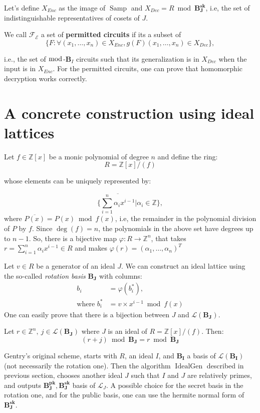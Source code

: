 Let's define $X_{Enc}$ as the image of $\operatorname{Samp}$ and $X_{Dec}=R\bmod\mathbf{B_J^{sk}}$, i.e, the set of indistinguishable representatives of cosets of $J$.

We call $\mathcal{F_E}$ a set of \textbf{permitted circuits} if its a subset of
$$\{F:\forall (x_1,\ldots,x_n)\in X_{Enc}, g(F)(x_1,\ldots,x_n)\in X_{Dec}\},$$

i.e., the set of $\bmod$-$\mathbf B_I$ circuits such that its generalization is in $X_{Dec}$ when the input is in $X_{Enc}$. For the permitted circuits, one can prove that homomorphic decryption works correctly.

\section{A concrete construction using ideal lattices}

Let $f\in\mathbb{Z}[x]$ be a monic polynomial of degree $n$ and define the ring:
$$R=\mathbb{Z}[x]/(f)$$

whose elements can be uniquely represented by:

$$\Big\{\overline{\displaystyle\sum_{i=1}^{n}\alpha_ix^{i-1}}|\alpha_i\in\mathbb Z\Big\},$$
where $\overline{P(x)}=P(x)\bmod f(x)$, i.e, the remainder in the polynomial division of $P$ by $f$. Since $\deg(f)=n$, the polynomials in the above set have degrees up to $n-1$. So, there is a bijective map $\varphi:R\to\mathbb{Z}^n$, that takes $r=\sum_{i=1}^{n}\alpha_ix^{i-1}\in R$ and makes $\varphi(r)=(\alpha_1,\ldots,\alpha_n)^T$

Let $v\in R$ be a generator of an ideal $J$. We can construct an ideal lattice using the so-called \textit{rotation basis} $\mathbf{B_J}$ with columns: 
\begin{align*}
    b_i&=\varphi(b_i^*),\\ 
    \text{where } b_i^*&=v\times x^{i-1}\bmod f(x)
\end{align*}
One can easily prove that there is a bijection between $J$ and $\mathcal{L}(\mathbf{B_J})$.
\begin{lemma}
\label{reduction}
Let $r\in\mathbb{Z}^n,~j\in\mathcal{L}(\mathbf{B_J})$ where $J$ is an ideal of $R=\mathbb{Z}[x]/(f)$. Then:
$$(r+j)\bmod \mathbf{B_J}=r\bmod \mathbf{B_J}$$
\end{lemma}

Gentry's original scheme, starts with $R$, an ideal $I$, and $\mathbf{B_I}$ a basis of $\mathcal{L}(\mathbf{B_I})$ (not necessarily the rotation one). Then the algorithm $\operatorname{IdealGen}$ described in previous section, chooses another ideal $J$ such that $I$ and $J$ are relatively primes, and outputs $\mathbf{B_J^{pk}},\mathbf{B_J^{sk}}$ basis of $\mathcal{L}_J$. A possible choice for the secret basis in the rotation one, and for the public basis, one can use the hermite normal form of $\mathbf{B_J^{sk}}$. 

